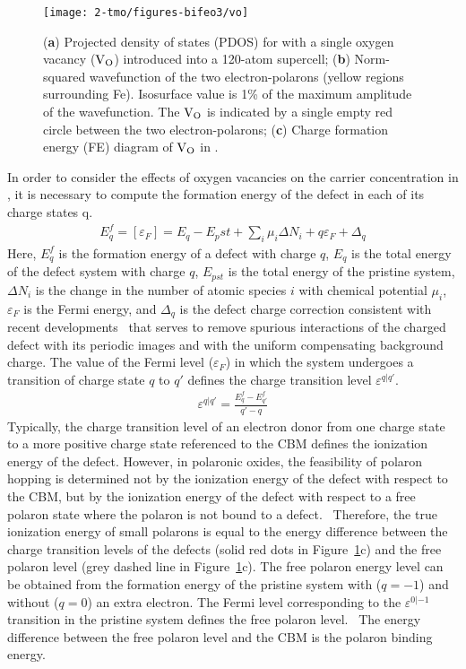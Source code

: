 \begin{figure}
    \centering
    \texttt{[image: 2-tmo/figures-bifeo3/vo]}
    \caption{
    (\textbf{a}) Projected density of states (PDOS) for  with a single oxygen vacancy ($\rm V_O$) introduced into a 120-atom supercell; (\textbf{b}) Norm-squared wavefunction of the two electron-polarons (yellow regions surrounding Fe). Isosurface value is 1\% of the maximum amplitude of the wavefunction. The $\rm V_O$ is indicated by a single empty red circle between the two electron-polarons; (\textbf{c}) Charge formation energy (FE) diagram of $\rm V_O$ in .
    }
    \label{bifeo3:fig:vo}
\end{figure}



In order to consider the effects of oxygen vacancies on the carrier concentration in , it is necessary to compute the formation energy of the defect in each of its charge states q.
\begin{align}
    E^f_q = [\varepsilon_F] = E_q - E_pst + \sum_i \mu_i \Delta N_i + q\varepsilon_F + \Delta_q
\end{align}
Here, $E^f_q$ is the formation energy of a defect with charge $q$, $E_q$ is the total energy of the defect system with charge $q$, $E_{pst}$ is the total energy of the pristine system, $\Delta N_i$ is the change in the number of atomic species $i$ with chemical potential $\mu_i$, $\varepsilon_F$ is the Fermi energy, and $\Delta_q$ is the defect charge correction consistent with recent developments~\cite{PING2017JCP,JDFTx} that serves to remove spurious interactions of the charged defect with its periodic images and with the uniform compensating background charge. The value of the Fermi level ($\varepsilon_F$) in which the system undergoes a transition of charge state $q$ to $q'$ defines the charge transition level $\varepsilon^{q|q'}$.
\begin{align}
    \varepsilon^{q|q'} = \frac{E^f_q-E^f_{q'}}{q'-q}
\end{align}
Typically, the charge transition level of an electron donor from one charge state to a more positive charge state referenced to the CBM defines the ionization energy of the defect. However, in polaronic oxides, the feasibility of polaron hopping is determined not by the ionization energy of the defect with respect to the CBM, but by the ionization energy of the defect with respect to a free polaron state where the polaron is not bound to a defect.~\cite{smart2017effect,seo2018role} Therefore, the true ionization energy of small polarons is equal to the energy difference between the charge transition levels of the defects (solid red dots in Figure~\ref{bifeo3:fig:vo}c) and the free polaron level (grey dashed line in Figure~\ref{bifeo3:fig:vo}c). The free polaron energy level can be obtained from the formation energy of the pristine system with ($q=-1$) and without ($q=0$) an extra electron. The Fermi level corresponding to the $\varepsilon^{0|-1}$ transition in the pristine system defines the free polaron level.~\cite{smart2017effect,seo2018role} The energy difference between the free polaron level and the CBM is the polaron binding energy.

